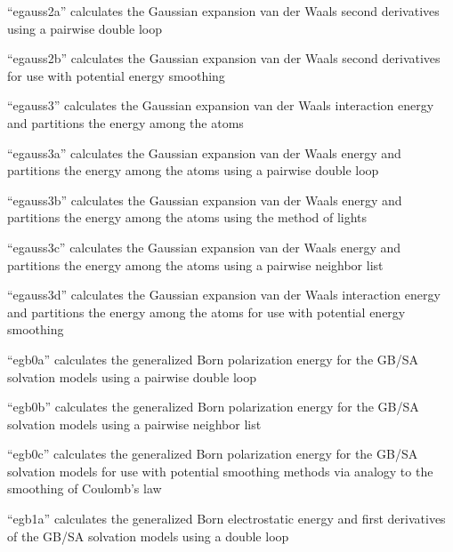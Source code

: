 \documentclass[letterpaper,11pt,english]{sphinxmanual}
\begin{document}
“egauss2a” calculates the Gaussian expansion van der Waals
second derivatives using a pairwise double loop


“egauss2b” calculates the Gaussian expansion van der Waals
second derivatives for use with potential energy smoothing


“egauss3” calculates the Gaussian expansion van der Waals
interaction energy and partitions the energy among the atoms


“egauss3a” calculates the Gaussian expansion van der Waals
energy and partitions the energy among the atoms using a
pairwise double loop


“egauss3b” calculates the Gaussian expansion van der Waals
energy and partitions the energy among the atoms using the
method of lights


“egauss3c” calculates the Gaussian expansion van der Waals
energy and partitions the energy among the atoms using a
pairwise neighbor list


“egauss3d” calculates the Gaussian expansion van der Waals
interaction energy and partitions the energy among the atoms
for use with potential energy smoothing


“egb0a” calculates the generalized Born polarization energy
for the GB/SA solvation models using a pairwise double loop


“egb0b” calculates the generalized Born polarization energy
for the GB/SA solvation models using a pairwise neighbor list


“egb0c” calculates the generalized Born polarization energy
for the GB/SA solvation models for use with potential smoothing
methods via analogy to the smoothing of Coulomb’s law


“egb1a” calculates the generalized Born electrostatic energy
and first derivatives of the GB/SA solvation models using a
double loop
\end{document}
